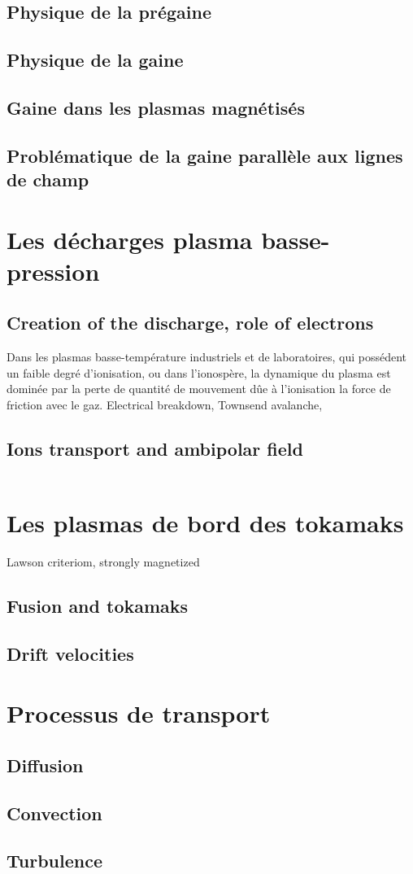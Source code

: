 			\subsection{Physique de la prégaine}
			\subsection{Physique de la gaine}
			\subsection{Gaine dans les plasmas magnétisés}
			\subsection{Problématique de la gaine parallèle aux lignes de champ}

	 \section{Les décharges plasma basse-pression}
		\subsection{Creation of the discharge, role of electrons}
		Dans les plasmas basse-température industriels et de laboratoires, qui possédent
			un faible degré d'ionisation, ou dans l'ionospère, la dynamique du plasma est dominée par
			la perte de quantité de mouvement dûe à l'ionisation la force de friction avec le gaz.
		Electrical breakdown, Townsend avalanche, 
		\subsection{Ions transport and ambipolar field}
		\begin{equation}
			\label{derivediffusion}
		\end{equation}
	\section{Les plasmas de bord des tokamaks}
		Lawson criteriom, strongly magnetized
		\subsection{Fusion and tokamaks}
		\subsection{Drift velocities}
		\label{vitessesDerive}
	\section{Processus de transport}
		\subsection{Diffusion}
		\subsection{Convection}
		\subsection{Turbulence}
	

		